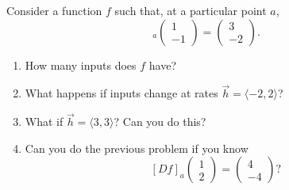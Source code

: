 \documentclass[12pt]{amsart}
\begin{document}
\begin{question}
    Consider a function $f$ such that, at a particular point $a$,
    \begin{equation*}
        [Df]_a\begin{pmatrix}
            1 \\ -1
        \end{pmatrix}
        = \begin{pmatrix}
            3 \\ -2
        \end{pmatrix}.
    \end{equation*}
    \begin{enumerate}
        \item How many inputs does $f$ have?
        \item What happens if inputs change at rates $\vec{h} = \langle -2, 2 \rangle$?
        \item What if $\vec{h} = \langle 3, 3 \rangle$? Can you do this?
        \item Can you do the previous problem if you know 
            $$[Df]_a \begin{pmatrix}
                1 \\2 
            \end{pmatrix}
            = 
            \begin{pmatrix}
                4 \\ -4
            \end{pmatrix}?
            $$
    \end{enumerate}
\end{question}
\end{document}
